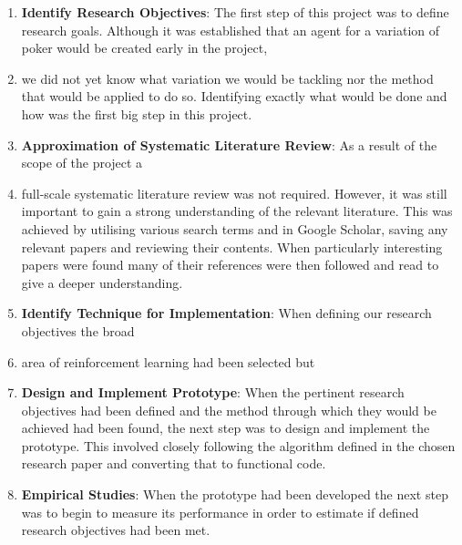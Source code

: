 \begin{enumerate}
    \item \textbf{Identify Research Objectives}: The first step of this project was to define research goals.
    Although it was established that an agent for a variation of poker would be created early in the project,
    \item we did not yet know what variation we would be tackling nor the method that would
    be applied to do so.
    Identifying exactly what would be done and how was the first big step in this project.
    \item \textbf{Approximation of Systematic Literature Review}: As a result of the scope of the project a
    \item full-scale systematic literature review was not required.
    However, it was still important to gain a strong understanding of the relevant literature.
    This was achieved by utilising various search terms and in Google Scholar, saving
    any relevant papers and reviewing their contents.
    When particularly interesting papers were found many of their references were then
    followed and read to give a deeper understanding.
    \item \textbf{Identify Technique for Implementation}: When defining our research objectives the broad
    \item area of reinforcement learning had been selected but
    \item \textbf{Design and Implement Prototype}: When the pertinent research objectives had been
    defined and the method through which they would be achieved had been found, the next step
    was to design and implement the prototype.
    This involved closely following the algorithm defined in the chosen research paper and
    converting that to functional code.
    \item \textbf{Empirical Studies}: When the prototype had been developed the next step was to begin to
    measure its performance in order to estimate if defined research objectives had been met.
\end{enumerate}


